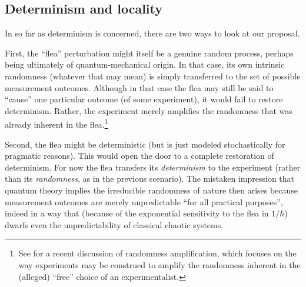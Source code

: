 \documentclass[12pt]{article}
\begin{document}
 \subsection{Determinism and  locality}\label{Bell}
 In so far as determinism is concerned, there are  two ways to look at our proposal.
 
 First, the ``flea'' perturbation might itself be a genuine random process, perhaps being  ultimately of quantum-mechanical origin. In that case, its own intrinsic randomness (whatever that may mean) is simply transferred to the set of possible measurement outcomes. Although in that case the flea may still be said to ``cause'' one particular outcome (of some experiment),  it would fail to restore determinism. Rather, the experiment merely amplifies the randomness that was already inherent in the flea.\footnote{See \cite{ColRen} for a recent discussion of randomness amplification, which focuses on the way experiments may be construed to 
 amplify the randomness inherent in  the (alleged) ``free'' choice of an experimentalist.}
 
Second, the flea might be deterministic (but is just modeled stochastically for pragmatic reasons). This would open the door to a complete restoration of determinism. For now  the flea transfers its \emph{determinism} to the experiment  (rather than its \emph{randomness}, as in the previous scenario). The mistaken impression that quantum theory implies the  irreducible randomness of nature then arises because measurement outcomes are merely
 unpredictable ``for all practical purposes'', indeed in a way that (because of the exponential sensitivity to the flea in $1/\hbar$) dwarfs even the unpredictability of classical chaotic systems. 
 
\end{document}
